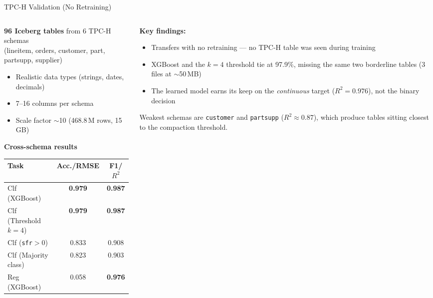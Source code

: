 \documentclass[aspectratio=169, 10pt]{beamer}
\begin{document}
\begin{frame}{TPC-H Validation (No Retraining)}
\begin{columns}[T]
\begin{column}{0.45\textwidth}
\textbf{96 Iceberg tables} from 6 TPC-H schemas\\
(lineitem, orders, customer, part, partsupp, supplier)
\begin{itemize}
  \item Realistic data types (strings, dates, decimals)
  \item 7--16 columns per schema
  \item Scale factor $\sim$10 (468.8\,M rows, 15\,GB)
\end{itemize}
\vspace{0.5em}
\centering
\smallskip
{\small\textbf{Cross-schema results}}\\[2pt]
{\small
\begin{tabular}{lcc}
\toprule
Task & Acc./RMSE & F1/$R^2$ \\
\midrule
Clf (XGBoost)            & \textcolor{cprimary}{\textbf{0.979}} & \textcolor{cprimary}{\textbf{0.987}} \\
Clf (Threshold $k{=}4$)  & \textcolor{cprimary}{\textbf{0.979}} & \textcolor{cprimary}{\textbf{0.987}} \\
Clf (\texttt{sfr}${>}0$) & 0.833 & 0.908 \\
Clf (Majority class)     & 0.823 & 0.903 \\
Reg (XGBoost)            & 0.058 & \textcolor{cprimary}{\textbf{0.976}} \\
\bottomrule
\end{tabular}}
\end{column}
\begin{column}{0.53\textwidth}
\textbf{Key findings:}
\begin{itemize}
  \item Transfers with \alert{no retraining} --- no TPC-H
        table was seen during training
  \item XGBoost and the $k{=}4$ threshold tie at \alert{97.9\%},
        missing the same two borderline tables
        (3 files at $\sim$50\,MB)
  \item The learned model earns its keep on the
        \emph{continuous} target (\alert{$R^2 = 0.976$}),
        not the binary decision
\end{itemize}
\vspace{0.3em}
\small Weakest schemas are \texttt{customer} and \texttt{partsupp}
($R^2 \approx 0.87$), which produce tables sitting closest to the
compaction threshold.
\end{column}
\end{columns}
\end{frame}
\end{document}
